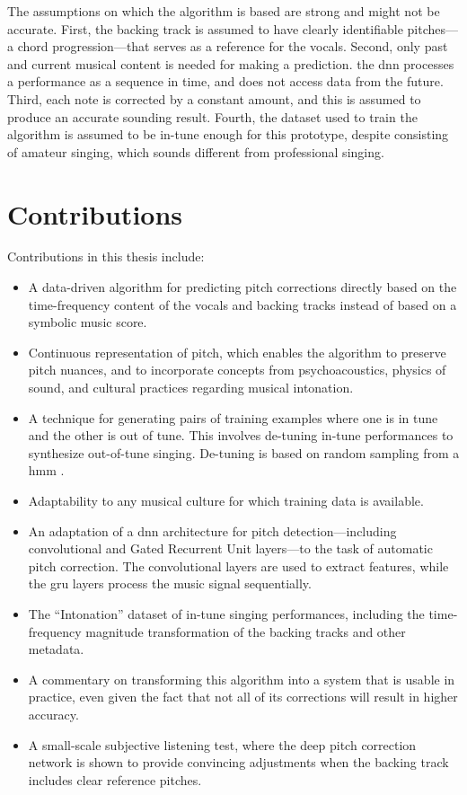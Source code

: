 The assumptions on which the algorithm is based are strong and might not be accurate. First, the backing track is assumed to have clearly identifiable pitches---a chord progression---that serves as a reference for the vocals. Second, only past and current musical content is needed for making a prediction. the \gls{dnn} processes a performance as a sequence in time, and does not access data from the future. Third, each note is corrected by a constant amount, and this is assumed to produce an accurate sounding result. Fourth, the dataset used to train the algorithm is assumed to be in-tune enough for this prototype, despite consisting of amateur singing, which sounds different from professional singing. %


\section{Contributions}
Contributions in this thesis include:
\begin{itemize}
    \item A data-driven algorithm for predicting pitch corrections directly based on the time-frequency content of the vocals and backing tracks instead of based on a symbolic music score.
    \item Continuous representation of pitch, which enables the algorithm to preserve pitch nuances, and to incorporate concepts from psychoacoustics, physics of sound, and cultural practices regarding musical intonation.
    \item A technique for generating pairs of training examples where one is in tune and the other is out of tune. This involves de-tuning in-tune performances to synthesize out-of-tune singing. De-tuning is based on random sampling from a \gls{hmm} \cite{rabiner1989tutorial}.
    \item Adaptability to any musical culture for which training data is available.
    \item An adaptation of a \gls{dnn} architecture for pitch detection---including convolutional and Gated Recurrent Unit \cite{chung2014empirical} layers---to the task of automatic pitch correction. The convolutional layers are used to extract features, while the \gls{gru} layers process the music signal sequentially.
    \item The ``Intonation'' dataset of in-tune singing performances, including the time-frequency magnitude transformation of the backing tracks and other metadata.
    \item A commentary on transforming this algorithm into a system that is usable in practice, even given the fact that not all of its corrections will result in higher accuracy.
    \item A small-scale subjective listening test, where the deep pitch correction network is shown to provide convincing adjustments when the backing track includes clear reference pitches.
\end{itemize}

